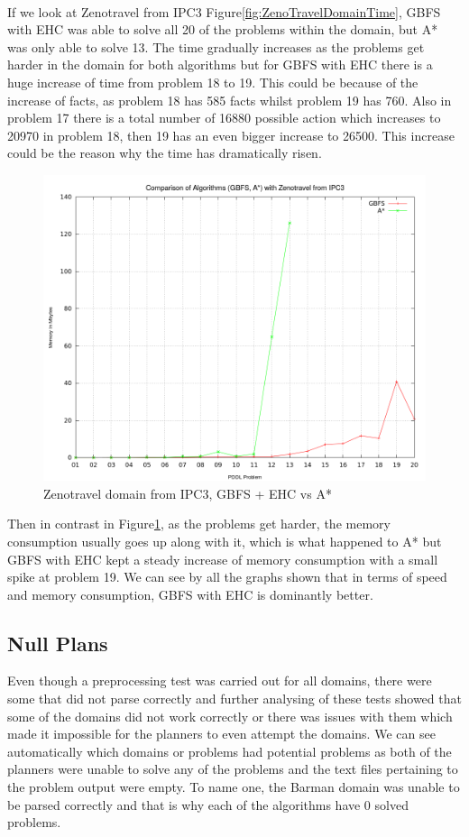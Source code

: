 \\
If we look at Zenotravel from IPC3 Figure\ref{fig:ZenoTravelDomainTime}, GBFS with EHC was able to solve all 20 of the problems within the domain, but A* was only able to solve 13. The time gradually increases as the problems get harder in the domain for both algorithms but for GBFS with EHC there is a huge increase of time from problem 18 to 19. This could be because of the increase of facts, as problem 18 has 585 facts whilst problem 19 has 760. Also in problem 17 there is a total number of 16880 possible action which increases to 20970 in problem 18, then 19 has an even bigger increase to 26500. This increase could be the reason why the time has dramatically risen. 
\begin{figure}[!htb]
    \centering
    \includegraphics[scale=0.35]{ZenoMemory.png}
    \caption{Zenotravel domain from IPC3, GBFS + EHC vs A* }
    \label{fig:ZenoTravelDomainMemory}
\end{figure}
Then in contrast in Figure\ref{fig:ZenoTravelDomainMemory}, as the problems get harder, the memory consumption usually goes up along with it, which is what happened to A* but GBFS with EHC kept a steady increase of memory consumption with a small spike at problem 19. We can see by all the graphs shown that in terms of speed and memory consumption, GBFS with EHC is dominantly better.
\clearpage
\subsection{Null Plans}
Even though a preprocessing test was carried out for all domains, there were some that did not parse correctly and further analysing of these tests showed that some of the domains did not work correctly or there was issues with them which made it impossible for the planners to even attempt the domains. We can see automatically which domains or problems had potential problems as both of the planners were unable to solve any of the problems and the text files pertaining to the problem output were empty. To name one, the Barman domain was unable to be parsed correctly and that is why each of the algorithms have 0 solved problems.
